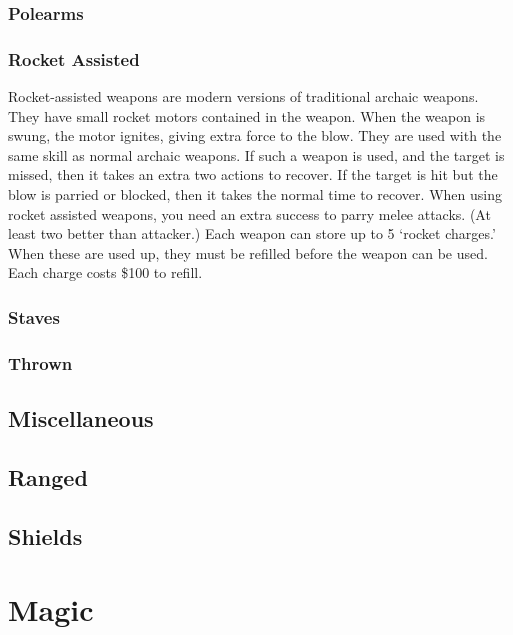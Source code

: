 \documentclass[twoside]{book}
\begin{document}
\subsection{Polearms}
    
\subsection{Rocket Assisted}
      Rocket-assisted weapons are modern versions of
               traditional archaic weapons. They have small rocket motors
               contained in the weapon. When the weapon is swung, the
               motor ignites, giving extra force to the blow. They are
               used with the same skill as normal archaic weapons.
                 If such a weapon is used, and the target is missed,
               then it takes an extra two actions to recover. If the
               target is hit but the blow is parried or blocked, then it
               takes the normal time to recover.   When using rocket assisted weapons, you need an
               extra success to parry melee attacks. (At least two better
               than attacker.)   Each weapon can store up to 5 `rocket
               charges.' When these are used up, they must be
               refilled before the weapon can be used. Each charge costs
               \$100 to refill. 
\subsection{Staves}
    
\subsection{Thrown}
    
\section{Miscellaneous}
    
\section{Ranged}
    
\section{Shields}
    
\chapter{Magic}
    
\end{document}
